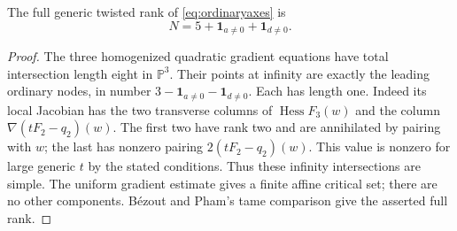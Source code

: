 \begin{lemma}\label{lem:axisrank}
The full generic twisted rank of \eqref{eq:ordinaryaxes} is
\[
 N=5+\mathbf1_{a\ne0}+\mathbf1_{d\ne0}.
\]
\end{lemma}
\begin{proof}
The three homogenized quadratic gradient equations have total
intersection length eight in $\mathbb P^3$. Their points at
infinity are exactly the leading ordinary nodes, in number
$3-\mathbf1_{a\ne0}-\mathbf1_{d\ne0}$. Each has length one.
Indeed its local Jacobian has the two transverse columns of
$\operatorname{Hess}F_3(w)$ and the column $\nabla(tF_2-q_2)(w)$.
The first two have rank two and are annihilated by pairing with
$w$; the last has nonzero pairing
$2(tF_2-q_2)(w)$. This value is nonzero for large generic $t$
by the stated conditions. Thus these infinity intersections are
simple. The uniform gradient estimate gives a finite affine
critical set; there are no other components. B\'ezout and
Pham's tame comparison give the asserted full rank.
\end{proof}

